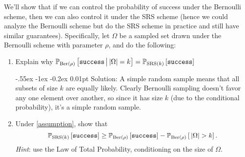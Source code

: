\documentclass[10pt, letterpaper]{scrartcl}
\makeatletter
\newlength{\savedparindent}
\newcommand\solParagraph{\@startsection{paragraph}{4}{\z@}%
    {-.55ex \@plus -1ex \@minus -0.2ex}%
    {0.01pt}%
    {\raggedsection\normalfont\sectfont\nobreak\size@paragraph}%
}
\newenvironment{solution}{\setlength{\parindent}{\savedparindent}\solParagraph{Solution:}}{}
\makeatother
\begin{document}
\begin{enumerate}[align=left, leftmargin=*, label=\sffamily\bfseries Problem \arabic*:]
{%
 We'll show that if we  can control the probability of success under the Bernoulli scheme, then we can also control it under the SRS scheme (hence we could analyze the Bernoulli scheme but do the SRS scheme in practice and still have similar guarantees).  Specifically, let $\Omega$ be a sampled set drawn under the Bernoulli scheme with parameter $\rho$, and do the following:
\begin{enumerate}
\item Explain why $\operatorname{\mathbb{P}}_{\text{Ber}(\rho)}\left[ \texttt{success} \,\big|\, |\Omega|=k \right] = \operatorname{\mathbb{P}}_{\text{SRS}(k)}\left[ \texttt{success}\right]$

\begin{solution}
A simple random sample means that all subsets of size $k$ are equally likely.  Clearly Bernoulli sampling doesn't favor any one element over another, so since it has size $k$ (due to the conditional probability), it's a simple random sample.
\end{solution}

\item Under \eqref{assumption}, show that  \label{item2}
\[
  \operatorname{\mathbb{P}}_{\text{SRS}(k)}\left[\texttt{success}\right] \ge \operatorname{\mathbb{P}}_{\text{Ber}(\rho)}\left[\texttt{success}\right] - \operatorname{\mathbb{P}}_{\text{Ber}(\rho)}\left[ \, |\Omega| > k \right].
\]
{\em Hint}: use the Law of Total Probability, conditioning on the size of $\Omega$.


\end{enumerate}}
\end{enumerate}
\end{document}
